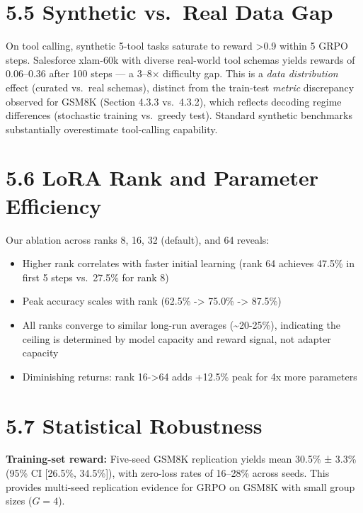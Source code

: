 \documentclass[
  american,
  11pt,
  a4paper,
  oneside]{report}
\providecommand{\tightlist}{%
  \setlength{\itemsep}{0pt}\setlength{\parskip}{0pt}}
\begin{document}
\section{5.5 Synthetic vs.~Real Data
Gap}\label{synthetic-vs.-real-data-gap}

On tool calling, synthetic 5-tool tasks saturate to reward
\textgreater0.9 within 5 GRPO steps. Salesforce xlam-60k with diverse
real-world tool schemas yields rewards of 0.06--0.36 after 100 steps ---
a 3--8× difficulty gap. This is a \emph{data distribution} effect
(curated vs.~real schemas), distinct from the train-test \emph{metric}
discrepancy observed for GSM8K (Section 4.3.3 vs.~4.3.2), which reflects
decoding regime differences (stochastic training vs.~greedy test).
Standard synthetic benchmarks substantially overestimate tool-calling
capability.

\section{5.6 LoRA Rank and Parameter
Efficiency}\label{lora-rank-and-parameter-efficiency}

Our ablation across ranks 8, 16, 32 (default), and 64 reveals:

\begin{itemize}
\tightlist
\item
  Higher rank correlates with faster initial learning (rank 64 achieves
  47.5\% in first 5 steps vs.~27.5\% for rank 8)
\item
  Peak accuracy scales with rank (62.5\% -\textgreater{} 75.0\%
  -\textgreater{} 87.5\%)
\item
  All ranks converge to similar long-run averages
  (\textasciitilde20-25\%), indicating the ceiling is determined by
  model capacity and reward signal, not adapter capacity
\item
  Diminishing returns: rank 16-\textgreater64 adds +12.5\% peak for 4x
  more parameters
\end{itemize}

\section{5.7 Statistical Robustness}\label{statistical-robustness}

\textbf{Training-set reward:} Five-seed GSM8K replication yields mean
30.5\% ± 3.3\% (95\% CI {[}26.5\%, 34.5\%{]}), with zero-loss rates of
16--28\% across seeds. This provides multi-seed replication evidence for
GRPO on GSM8K with small group sizes (\(G{=}4\)).
\end{document}
